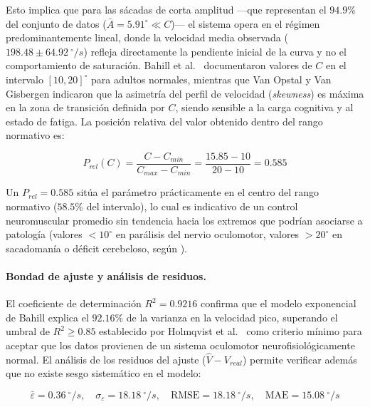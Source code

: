 Esto implica que para las sácadas de corta amplitud —que representan el $94.9\%$ del conjunto de datos ($\bar{A} = 5.91^\circ \ll C$)— el sistema opera en el régimen predominantemente lineal, donde la velocidad media observada ($198.48 \pm 64.92~^\circ/s$) refleja directamente la pendiente inicial de la curva y no el comportamiento de saturación.
Bahill et al.\ \cite{bahill1975} documentaron valores de $C$ en el intervalo $[10, 20]^\circ$ para adultos normales, mientras que Van Opstal y Van Gisbergen \cite{vanopstal1987skewness} indicaron que la asimetría del perfil de velocidad (\textit{skewness}) es máxima en la zona de transición definida por $C$, siendo sensible a la carga cognitiva y al estado de fatiga.
La posición relativa del valor obtenido dentro del rango normativo es:

\begin{equation}
	P_{rel}(C) = \frac{C - C_{min}}{C_{max} - C_{min}} = \frac{15.85 - 10}{20 - 10} = 0.585
	\label{eq:C_relpos}
\end{equation}

Un $P_{rel} = 0.585$ sitúa el parámetro prácticamente en el centro del rango normativo ($58.5\%$ del intervalo), lo cual es indicativo de un control neuromuscular promedio sin tendencia hacia los extremos que podrían asociarse a patología (valores $< 10^\circ$ en parálisis del nervio oculomotor, valores $> 20^\circ$ en sacadomanía o déficit cerebeloso, según \cite{leigh2015neurology}).
\paragraph{Bondad de ajuste y análisis de residuos.}

El coeficiente de determinación $R^2 = 0.9216$ confirma que el modelo exponencial de Bahill explica el $92.16\%$ de la varianza en la velocidad pico, superando el umbral de $R^2 \geq 0.85$ establecido por Holmqvist et al.\ \cite{holmqvist2011eye} como criterio mínimo para aceptar que los datos provienen de un sistema oculomotor neurofisiológicamente normal.
El análisis de los residuos del ajuste ($\hat{V} - V_{real}$) permite verificar además que no existe sesgo sistemático en el modelo:

\begin{equation}
	\bar{\varepsilon} = 0.36~^\circ/s, \quad
	\sigma_\varepsilon = 18.18~^\circ/s, \quad
	\text{RMSE} = 18.18~^\circ/s, \quad
	\text{MAE} = 15.08~^\circ/s
	\label{eq:residuos_stats}
\end{equation}

